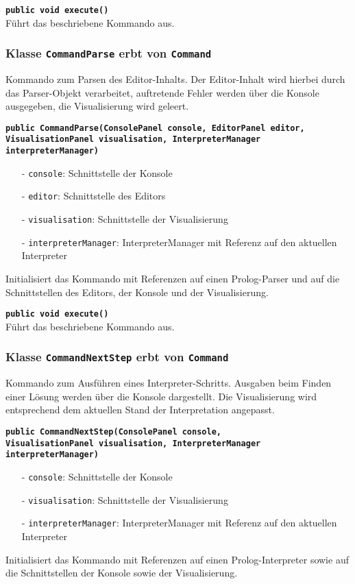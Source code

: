 \documentclass[parskip=full,11pt,twoside]{scrartcl}
\begin{document}
\textbf{\texttt{public void execute()}}\\
Führt das beschriebene Kommando aus.

\subsubsection{Klasse \texttt{CommandParse} erbt von \texttt{Command}}

Kommando zum Parsen des Editor-Inhalts. Der Editor-Inhalt wird hierbei durch das Parser-Objekt verarbeitet, auftretende Fehler werden über die Konsole ausgegeben, die Visualisierung wird geleert.

\textbf{\texttt{public CommandParse(ConsolePanel console, EditorPanel editor,\\VisualisationPanel visualisation, InterpreterManager interpreterManager)}}
\begin{itemize}[noitemsep]
	\item[-] \texttt{console}: Schnittstelle der Konsole
	\item[-] \texttt{editor}: Schnittstelle des Editors
	\item[-] \texttt{visualisation}: Schnittstelle der Visualisierung
	\item[-] \texttt{interpreterManager}: InterpreterManager mit Referenz auf den aktuellen Interpreter
\end{itemize}
Initialisiert das Kommando mit Referenzen auf einen Prolog-Parser und auf die Schnittstellen des Editors, der Konsole und der Visualisierung.

\textbf{\texttt{public void execute()}}\\
Führt das beschriebene Kommando aus.

\subsubsection{Klasse \texttt{CommandNextStep} erbt von \texttt{Command}}

Kommando zum Ausführen eines Interpreter-Schritts. Ausgaben beim Finden einer Lösung werden über die Konsole dargestellt. Die Visualisierung wird entsprechend dem aktuellen Stand der Interpretation angepasst.

\textbf{\texttt{public CommandNextStep(ConsolePanel console,\\VisualisationPanel visualisation, InterpreterManager interpreterManager)}}
\begin{itemize}[noitemsep]
	\item[-] \texttt{console}: Schnittstelle der Konsole
	\item[-] \texttt{visualisation}: Schnittstelle der Visualisierung
	\item[-] \texttt{interpreterManager}: InterpreterManager mit Referenz auf den aktuellen Interpreter
\end{itemize}
Initialisiert das Kommando mit Referenzen auf einen Prolog-Interpreter sowie auf die Schnittstellen der Konsole sowie der Visualisierung.
\end{document}
